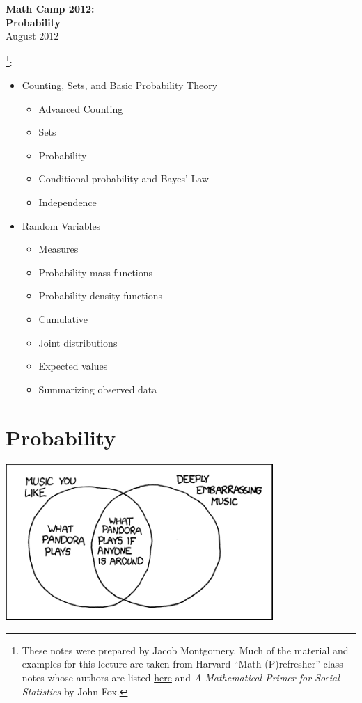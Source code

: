 \documentclass[11pt]{article}
\newcommand{\bi}{\begin{itemize}}
\newcommand{\ei}{\end{itemize}}
\newcommand{\noi}{\noindent}
\begin{document}
\pagestyle{myheadings}
\parskip=6pt
\thispagestyle{empty}
\renewcommand{\thefootnote}{\fnsymbol{footnote}}

\begin{centering}
{\Large \bf Math Camp 2012:\\[9pt]
Probability}\\[18pt]
August 2012\\[36pt]
\end{centering}


\noi {\bf Topics}\footnote{These notes were prepared by Jacob Montgomery. Much of the material and examples for
this lecture are taken from Harvard ``Math (P)refresher'' class notes
whose authors are listed
\href{http://people.hmdc.harvard.edu/~mathpre/mathnotes/lectures/index.html}{here}
and \textit{A Mathematical Primer for Social Statistics} by John Fox.}:
\bi
  \item Counting, Sets, and Basic Probability Theory 
\bi
  \item Advanced Counting
  \item Sets
  \item Probability
  \item Conditional probability and Bayes' Law
   \item Independence 
\ei
\item Random Variables
\bi
\item Measures
\item Probability mass functions 
\item Probability density functions
\item Cumulative
\item Joint distributions
\item Expected values
\item Summarizing observed data
\ei  
\ei

\newpage

\section{Probability}

\begin{center}
\includegraphics[width=4in]{pandora}
\end{center}
\end{document}
